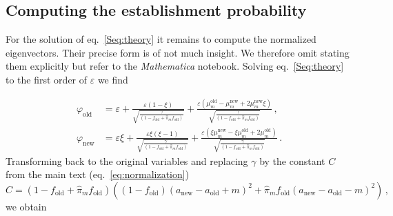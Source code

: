 \documentclass[a4paper,11pt]{scrartcl}
\begin{document}

\subsection*{Computing the establishment probability}
For the solution of eq.~\eqref{Seq:theory} it remains to compute the normalized eigenvectors. Their precise form is of not much insight. We therefore omit stating them explicitly but refer to the \textit{Mathematica} notebook. Solving eq.~\eqref{Seq:theory} to the first order of $\varepsilon$ we find

\begin{equation}
    \begin{aligned}
        \varphi_{\text{old}} &= \varepsilon + \frac{\varepsilon\left(1-\xi\right)}{\sqrt{\frac{\gamma}{(1-f_{\text{old}}+\widehat{\pi}_m f_{\text{old}})}}}  + \frac{\varepsilon\left(\mu_m^{\text{old}} -\mu_m^{\text{new}} + 2 \mu_m^{\text{new}}\xi  \right)}{\sqrt{\frac{\gamma}{(1-f_{\text{old}}+\widehat{\pi}_m f_{\text{old}})}}}\, ,\\
        \varphi_{\text{new}} &= \varepsilon\xi + \frac{\varepsilon\xi \left(\xi-1\right)}{\sqrt{\frac{\gamma}{(1-f_{\text{old}}+\widehat{\pi}_m f_{\text{old}})}}} + \frac{\varepsilon\left(\xi \mu_m^{\text{new}} -\xi \mu_m^{\text{old}} + 2 \mu_m^{\text{old}}  \right)}{\sqrt{\frac{\gamma}{(1-f_{\text{old}}+\widehat{\pi}_m f_{\text{old}})}}}\, .
    \end{aligned}
\end{equation}
%
Transforming back to the original variables and replacing $\gamma$ by the constant $C$ from the main text (eq.~\eqref{eq:normalization})
\begin{equation}
    C = (1-f_{\text{old}}+\widehat{\pi}_m f_{\text{old}}) \left((1-f_{\text{old}})(a_{\text{new}}-a_{\text{old}}+m)^2 + \widehat{\pi}_m f_{\text{old}} (a_{\text{new}}-a_{\text{old}}-m)^2\right)\, ,
\end{equation}
we obtain
\end{document}
